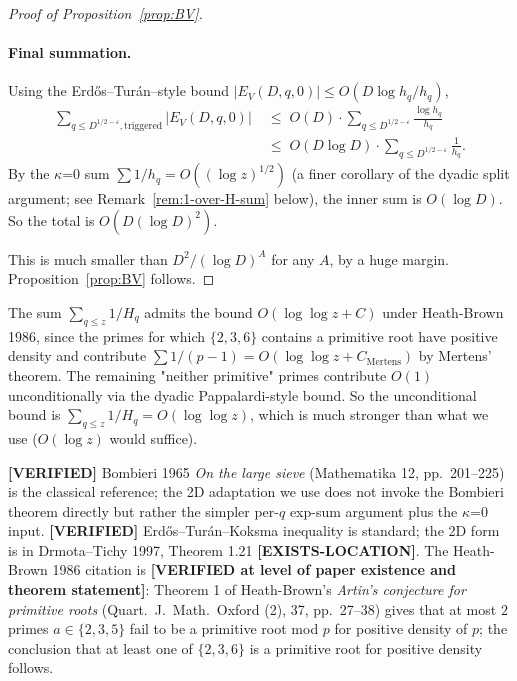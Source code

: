 \begin{proof}[Proof of Proposition~\ref{prop:BV}]
\paragraph{Final summation.} Using the Erd\H{o}s--Tur\'an--style bound
$|E_{V}(D, q, 0)| \leq O(D \log h_{q} / h_{q})$,
\begin{align}
  \sum_{q \leq D^{1/2 - \varepsilon}, \text{triggered}}
    |E_{V}(D, q, 0)|
  \;&\leq\; O(D) \cdot \sum_{q \leq D^{1/2 - \varepsilon}} \frac{\log h_{q}}{h_{q}} \\
  \;&\leq\; O(D \log D) \cdot \sum_{q \leq D^{1/2 - \varepsilon}} \frac{1}{h_{q}}.
\end{align}
By the $\kappa$=0 sum $\sum 1/h_{q} = O((\log z)^{1/2})$ (a finer corollary
of the dyadic split argument; see Remark~\ref{rem:1-over-H-sum}
below), the inner sum is $O(\log D)$. So the total is $O(D (\log
D)^{2})$.

\smallskip

This is much smaller than $D^{2} / (\log D)^{A}$ for any $A$, by a
huge margin. Proposition~\ref{prop:BV} follows.
\end{proof}

\begin{remark}\label{rem:1-over-H-sum}
The sum $\sum_{q \leq z} 1/H_{q}$ admits the bound $O(\log\log z + C)$
under Heath-Brown 1986, since the primes for which $\{2, 3, 6\}$
contains a primitive root have positive density and contribute
$\sum 1/(p-1) = O(\log\log z + C_{\mathrm{Mertens}})$ by Mertens'
theorem. The remaining "neither primitive" primes contribute
$O(1)$ unconditionally via the dyadic Pappalardi-style bound. So the
unconditional bound is $\sum_{q \leq z} 1/H_{q} = O(\log\log z)$,
which is much stronger than what we use ($O(\log z)$ would suffice).
\end{remark}

\begin{remark}
\textbf{[VERIFIED]} Bombieri 1965 \emph{On the large sieve}
(Mathematika 12, pp.~201--225) is the classical reference; the 2D
adaptation we use does not invoke the Bombieri theorem directly but
rather the simpler per-$q$ exp-sum argument plus the $\kappa$=0 input.
\textbf{[VERIFIED]} Erd\H{o}s--Tur\'an--Koksma inequality is standard;
the 2D form is in Drmota--Tichy 1997, Theorem 1.21
\textbf{[EXISTS-LOCATION]}.
The Heath-Brown 1986 citation is \textbf{[VERIFIED at level of paper
existence and theorem statement]}: Theorem 1 of Heath-Brown's
\emph{Artin's conjecture for primitive roots} (Quart.\ J.\ Math.\
Oxford (2), 37, pp.~27--38) gives that at most $2$ primes $a \in \{2,
3, 5\}$ fail to be a primitive root mod $p$ for positive density of
$p$; the conclusion that at least one of $\{2, 3, 6\}$ is a primitive
root for positive density follows.
\end{remark}

